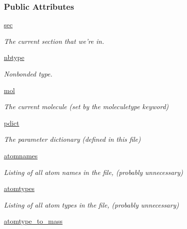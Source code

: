 \subsubsection*{\-Public \-Attributes}
\begin{DoxyCompactItemize}
\item 
\hyperlink{classforcebalance_1_1gmxio_1_1ITP__Reader_aac592b8daf1ba9756800348ce709dc4c}{sec}
\begin{DoxyCompactList}\small\item\em \-The current section that we're in. \end{DoxyCompactList}\item 
\hyperlink{classforcebalance_1_1gmxio_1_1ITP__Reader_aae94cb455aefdb15a29f5a05890aae77}{nbtype}
\begin{DoxyCompactList}\small\item\em \-Nonbonded type. \end{DoxyCompactList}\item 
\hyperlink{classforcebalance_1_1gmxio_1_1ITP__Reader_a4bfd13e4b79e0d89f0263d1f2e566850}{mol}
\begin{DoxyCompactList}\small\item\em \-The current molecule (set by the moleculetype keyword) \end{DoxyCompactList}\item 
\hyperlink{classforcebalance_1_1gmxio_1_1ITP__Reader_a50049e3e2fde23d7eb6f0c8423477ff3}{pdict}
\begin{DoxyCompactList}\small\item\em \-The parameter dictionary (defined in this file) \end{DoxyCompactList}\item 
\hyperlink{classforcebalance_1_1gmxio_1_1ITP__Reader_aa3bfe6da399c23d1d9d077e8166f1abf}{atomnames}
\begin{DoxyCompactList}\small\item\em \-Listing of all atom names in the file, (probably unnecessary) \end{DoxyCompactList}\item 
\hyperlink{classforcebalance_1_1gmxio_1_1ITP__Reader_a6fb1d3d32afd7906a2eb7d09e6dd7eed}{atomtypes}
\begin{DoxyCompactList}\small\item\em \-Listing of all atom types in the file, (probably unnecessary) \end{DoxyCompactList}\item 
\hyperlink{classforcebalance_1_1gmxio_1_1ITP__Reader_ade9ef131d46e92d5bde35832c2605c44}{atomtype\-\_\-to\-\_\-mass}

\end{DoxyCompactItemize}
